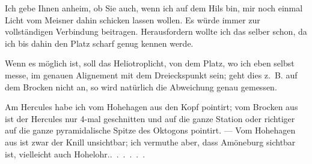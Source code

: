 \par\noindent\hspace*{\parindent}Ich gebe Ihnen anheim, ob Sie auch, wenn ich auf dem Hils bin, mir noch einmal Licht vom Meisner dahin schicken lassen wollen.
Es würde immer zur vollständigen Verbindung beitragen.
Herausfordern wollte ich das selber schon, da ich bis dahin den Platz scharf genug kennen werde.
\par\noindent\hspace*{\parindent}Wenn es möglich ist, soll das Heliotroplicht, von dem Platz, wo ich eben selbst messe, im genauen Alignement mit dem Dreieckspunkt sein; geht dies z.~B. auf dem Brocken nicht an, so wird natürlich die Abweichung genau gemessen.
\par\noindent\hspace*{\parindent}Am Hercules habe ich vom Hohehagen aus den Kopf pointirt; vom Brocken aus ist der Hercules nur 4-mal geschnitten und auf die ganze Station oder richtiger auf die ganze pyramidalische Spitze des Oktogons pointirt. --- Vom Hohehagen aus ist zwar der Knill unsichtbar; ich vermuthe aber, dass Amöneburg sichtbar ist, vielleicht auch \mbox{Hohelohr.\quad.\ .\ .\ .\ .\ .}
\par
\endgroup
